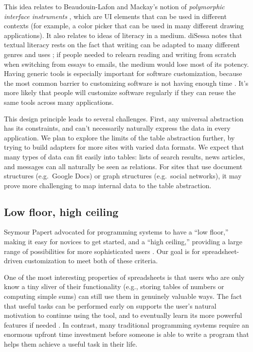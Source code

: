 \documentclass[english,submission]{programming}
\begin{document}
This idea relates to Beaudouin-Lafon and Mackay's notion of
\emph{polymorphic interface instruments} \autocite{beaudouin-lafon2000},
which are UI elements that can be used in different contexts (for
example, a color picker that can be used in many different drawing
applications). It also relates to ideas of literacy in a medium. diSessa
notes that textual literacy rests on the fact that writing can be
adapted to many different genres and uses \autocite{disessa2000}; if
people needed to relearn reading and writing from scratch when switching
from essays to emails, the medium would lose most of its potency. Having
generic tools is especially important for software customization,
because the most common barrier to customizing software is not having
enough time \autocite{mackay1991}. It's more likely that people will
customize software regularly if they can reuse the same tools across
many applications.

This design principle leads to several challenges. First, any universal
abstraction has its constraints, and can't necessarily naturally express
the data in every application. We plan to explore the limits of the
table abstraction further, by trying to build adapters for more sites
with varied data formats. We expect that many types of data can fit
easily into tables: lists of search results, news articles, and messages
can all naturally be seen as relations. For sites that use document
structures (e.g.~Google Docs) or graph structures (e.g.~social
networks), it may prove more challenging to map internal data to the
table abstraction.

\hypertarget{low-floor-high-ceiling}{%
\subsection{Low floor, high ceiling}\label{low-floor-high-ceiling}}

Seymour Papert advocated for programming systems to have a ``low
floor,'' making it easy for novices to get started, and a ``high
ceiling,'' providing a large range of possibilities for more
sophisticated users \autocite{resnick2016}. Our goal is for
spreadsheet-driven customization to meet both of these criteria.

One of the most interesting properties of spreadsheets is that users who
are only know a tiny sliver of their functionality (e.g., storing tables
of numbers or computing simple sums) can still use them in genuinely
valuable ways. The fact that useful tasks can be performed early on
supports the user's natural motivation to continue using the tool, and
to eventually learn its more powerful features if needed
\autocite{nardi1991}. In contrast, many traditional programming systems
require an enormous upfront time investment before someone is able to
write a program that helps them achieve a useful task in their life.
\end{document}
